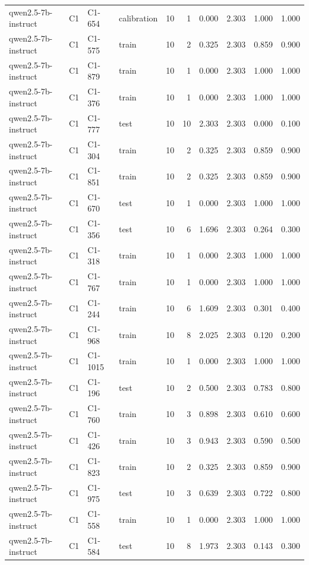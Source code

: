 \begin{table}
\begin{tabular}{llllrrrrrr}
qwen2.5-7b-instruct & C1 & C1-654 & calibration & 10 & 1 & 0.000 & 2.303 & 1.000 & 1.000 \\
qwen2.5-7b-instruct & C1 & C1-575 & train & 10 & 2 & 0.325 & 2.303 & 0.859 & 0.900 \\
qwen2.5-7b-instruct & C1 & C1-879 & train & 10 & 1 & 0.000 & 2.303 & 1.000 & 1.000 \\
qwen2.5-7b-instruct & C1 & C1-376 & train & 10 & 1 & 0.000 & 2.303 & 1.000 & 1.000 \\
qwen2.5-7b-instruct & C1 & C1-777 & test & 10 & 10 & 2.303 & 2.303 & 0.000 & 0.100 \\
qwen2.5-7b-instruct & C1 & C1-304 & train & 10 & 2 & 0.325 & 2.303 & 0.859 & 0.900 \\
qwen2.5-7b-instruct & C1 & C1-851 & train & 10 & 2 & 0.325 & 2.303 & 0.859 & 0.900 \\
qwen2.5-7b-instruct & C1 & C1-670 & test & 10 & 1 & 0.000 & 2.303 & 1.000 & 1.000 \\
qwen2.5-7b-instruct & C1 & C1-356 & test & 10 & 6 & 1.696 & 2.303 & 0.264 & 0.300 \\
qwen2.5-7b-instruct & C1 & C1-318 & train & 10 & 1 & 0.000 & 2.303 & 1.000 & 1.000 \\
qwen2.5-7b-instruct & C1 & C1-767 & train & 10 & 1 & 0.000 & 2.303 & 1.000 & 1.000 \\
qwen2.5-7b-instruct & C1 & C1-244 & train & 10 & 6 & 1.609 & 2.303 & 0.301 & 0.400 \\
qwen2.5-7b-instruct & C1 & C1-968 & train & 10 & 8 & 2.025 & 2.303 & 0.120 & 0.200 \\
qwen2.5-7b-instruct & C1 & C1-1015 & train & 10 & 1 & 0.000 & 2.303 & 1.000 & 1.000 \\
qwen2.5-7b-instruct & C1 & C1-196 & test & 10 & 2 & 0.500 & 2.303 & 0.783 & 0.800 \\
qwen2.5-7b-instruct & C1 & C1-760 & train & 10 & 3 & 0.898 & 2.303 & 0.610 & 0.600 \\
qwen2.5-7b-instruct & C1 & C1-426 & train & 10 & 3 & 0.943 & 2.303 & 0.590 & 0.500 \\
qwen2.5-7b-instruct & C1 & C1-823 & train & 10 & 2 & 0.325 & 2.303 & 0.859 & 0.900 \\
qwen2.5-7b-instruct & C1 & C1-975 & test & 10 & 3 & 0.639 & 2.303 & 0.722 & 0.800 \\
qwen2.5-7b-instruct & C1 & C1-558 & train & 10 & 1 & 0.000 & 2.303 & 1.000 & 1.000 \\
qwen2.5-7b-instruct & C1 & C1-584 & test & 10 & 8 & 1.973 & 2.303 & 0.143 & 0.300 \\

\end{tabular}
\end{table}
